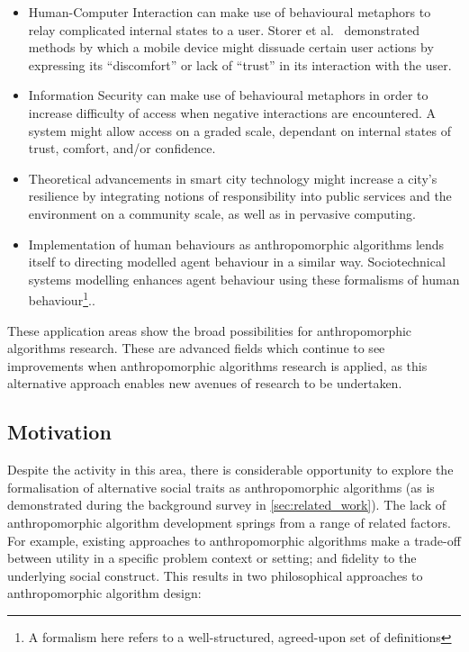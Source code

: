 \begin{itemize}
  \item Human-Computer Interaction can make use of behavioural metaphors to relay complicated internal states to a user. Storer et al.~\cite{storer_mobile_behaviour_poster} demonstrated methods by which a mobile device might dissuade certain user actions by expressing its ``discomfort'' or lack of ``trust'' in its interaction with the user.
  \item Information Security can make use of behavioural metaphors in order to increase difficulty of access when negative interactions are encountered. A system might allow access on a graded scale, dependant on internal states of trust, comfort, and/or confidence.
  \item Theoretical advancements in smart city technology might increase a city's resilience by integrating notions of responsibility into public services and the environment on a community scale, as well as in pervasive computing\cite{wallis_talk_about_x_talk}.\par
  \item Implementation of human behaviours as anthropomorphic algorithms lends itself to directing modelled agent behaviour in a similar way. Sociotechnical systems modelling enhances agent behaviour using these formalisms of human behaviour\footnote{A formalism here refers to a well-structured, agreed-upon set of definitions}.\cite{Marsh1994FormalisingConcept}.
\end{itemize}

These application areas show the broad possibilities for anthropomorphic algorithms research. These are advanced fields which continue to see improvements when anthropomorphic algorithms research is applied, as this alternative approach enables new avenues of research to be undertaken.\par

\subsection{Motivation}\label{subsec:formalism_types}

Despite the activity in this area, there is considerable opportunity to explore the formalisation of alternative social traits as anthropomorphic algorithms (as is demonstrated during the background survey in \cref{sec:related_work}). The lack of anthropomorphic algorithm development springs from a range of related factors. For example, existing approaches to anthropomorphic algorithms make a trade-off between utility in a specific problem context or setting; and fidelity to the underlying social construct. This results in two philosophical approaches to anthropomorphic algorithm design:

